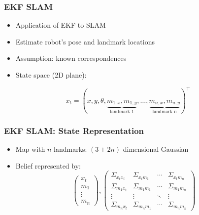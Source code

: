 \begin{frame}
    \frametitle{EKF SLAM}

    \begin{itemize}
        \item Application of EKF to SLAM
        \item Estimate robot's pose and landmark locations
        \item Assumption: known correspondences
        \item State space (2D plane):
    \end{itemize}
    \[ x_t = (x, y, \theta, \underbrace{m_{1,x}, m_{1,y}}_{\text{landmark 1}}, \ldots, \underbrace{m_{n,x}, m_{n,y}}_{\text{landmark n}} )^{\top} \]
\end{frame}

\begin{frame}
    \frametitle{EKF SLAM: State Representation}

    \begin{itemize}
        \item Map with $n$ landmarks: $(3+2n)$-dimensional Gaussian
        \item Belief represented by:
        \[
        \begin{pmatrix}
        x_t \\
        m_1 \\
        \vdots \\
        m_n
        \end{pmatrix},
        \begin{pmatrix}
        \Sigma_{x_t x_t} & \Sigma_{x_t m_1} & \cdots & \Sigma_{x_t m_n} \\
        \Sigma_{m_1 x_t} & \Sigma_{m_1 m_1} & \cdots & \Sigma_{m_1 m_n} \\
        \vdots & \vdots & \ddots & \vdots \\
        \Sigma_{m_n x_t} & \Sigma_{m_n m_1} & \cdots & \Sigma_{m_n m_n}
        \end{pmatrix}
        \]
    \end{itemize}
\end{frame}

